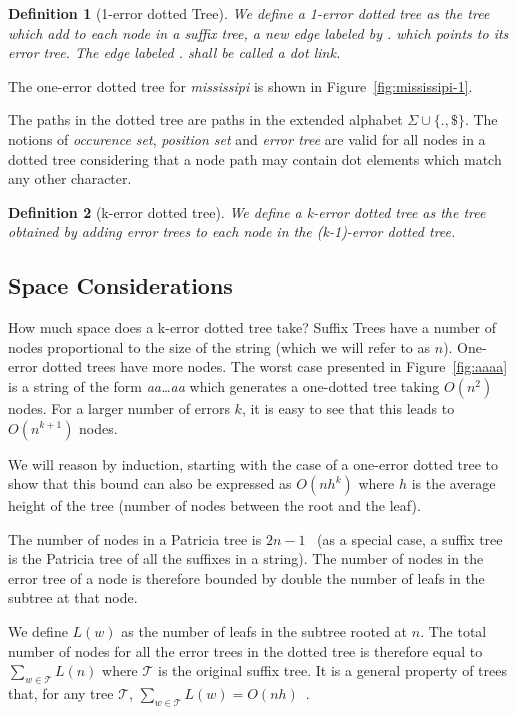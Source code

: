 \documentclass[a4paper,10pt]{article}
\newcommand{\putstring}[1]{\textsl{#1}}
\newtheorem{definition}{Definition}
\begin{document}
\begin{definition}[1-error dotted Tree]
We define a \emph{1-error dotted tree} as the tree which add to each node in a suffix tree, a new edge labeled by \putstring{.} which points to its error tree. The edge labeled \putstring{.} shall be called a \emph{dot link}.
\end{definition}

The one-error dotted tree for \putstring{mississipi} is shown in Figure~\ref{fig:mississipi-1}.

The paths in the dotted tree are paths in the extended alphabet $\Sigma\cup\{.,\$\}$. The notions of \emph{occurence set}, \emph{position set} and \emph{error tree} are valid for all nodes in a dotted tree considering that a node path may contain dot elements which match any other character.

\begin{definition}[k-error dotted tree]
We define a k-error dotted tree as the tree obtained by adding error trees to each node in the (k-1)-error dotted tree.
\end{definition}

\subsection{Space Considerations}

How much space does a k-error dotted tree take? Suffix Trees have a number of nodes proportional to the size of the string (which we will refer to as $n$). One-error dotted trees have more nodes. The worst case presented in Figure~\ref{fig:aaaa} is a string of the form \putstring{aa\ldots{}aa} which generates a one-dotted tree taking $O(n^2)$ nodes. For a larger number of errors $k$, it is easy to see that this leads to $O(n^{k+1})$ nodes.

We will reason by induction, starting with the case of a one-error dotted tree to show that this bound can also be expressed as $O(nh^k)$ where $h$ is the average height of the tree (number of nodes between the root and the leaf).

The number of nodes in a Patricia tree is $2n-1$~\cite{patricia} (as a special case, a suffix tree is the Patricia tree of all the suffixes in a string). The number of nodes in the error tree of a node is therefore bounded by double the number of leafs in the subtree at that node.

We define $L(w)$ as the number of leafs in the subtree rooted at $n$. The total number of nodes for all the error trees in the dotted tree is therefore equal to $\sum_{w \in \mathcal{T}}L(n)$ where $\mathcal{T}$ is the original suffix tree. It is a general property of trees that, for any tree $\mathcal{T}$, $\sum_{w \in \mathcal{T}}L(w) = O(nh)$~\cite{whatever}.
\end{document}
